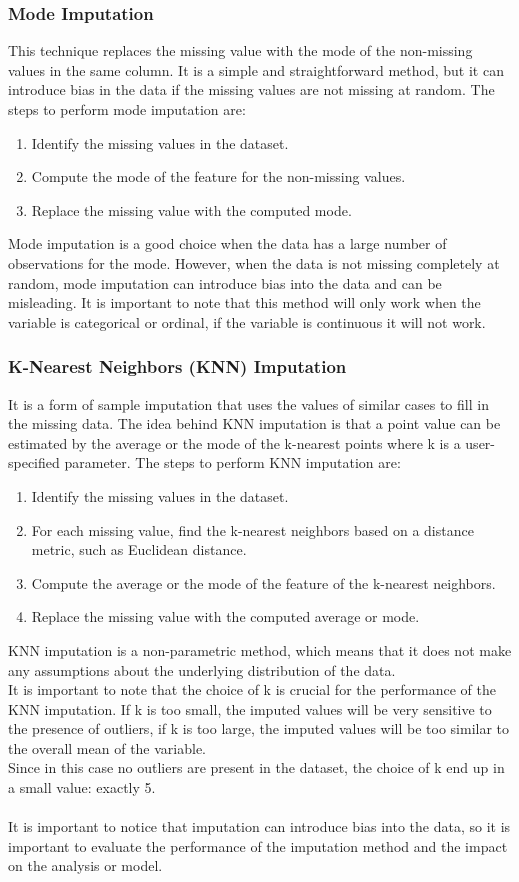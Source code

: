 \documentclass{article}
\begin{document}
\subsubsection*{Mode Imputation}
This technique replaces the missing value with the mode of the non-missing values in the same column. It is a simple and straightforward method, but it can introduce bias in the data if the missing values are not missing at random. The steps to perform mode imputation are:
\begin{enumerate}
    \item Identify the missing values in the dataset.
    \item Compute the mode of the feature for the non-missing values.
    \item Replace the missing value with the computed mode.
\end{enumerate}
Mode imputation is a good choice when the data has a large number of observations for the mode. However, when the data is not missing completely at random, mode imputation can introduce bias into the data and can be misleading. It is important to note that this method will only work when the variable is categorical or ordinal, if the variable is continuous it will not work. 

\subsubsection*{K-Nearest Neighbors (KNN) Imputation}
It is a form of sample imputation that uses the values of similar cases to fill in the missing data. The idea behind KNN imputation is that a point value can be estimated by the average or the mode of the k-nearest points where k is a user-specified parameter. The steps to perform KNN imputation are:
\begin{enumerate}
    \item Identify the missing values in the dataset.
    \item For each missing value, find the k-nearest neighbors based on a distance metric, such as Euclidean distance.
    \item Compute the average or the mode of the feature of the k-nearest neighbors.
    \item Replace the missing value with the computed average or mode.
\end{enumerate}
KNN imputation is a non-parametric method, which means that it does not make any assumptions about the underlying distribution of the data.\\
It is important to note that the choice of k is crucial for the performance of the KNN imputation. If k is too small, the imputed values will be very sensitive to the presence of outliers, if k is too large, the imputed values will be too similar to the overall mean of the variable.\\
Since in this case no outliers are present in the dataset, the choice of k end up in a small value: exactly 5.\\\\
It is important to notice that imputation can introduce bias into the data, so it is important to evaluate the performance of the imputation method and the impact on the analysis or model.
\end{document}
